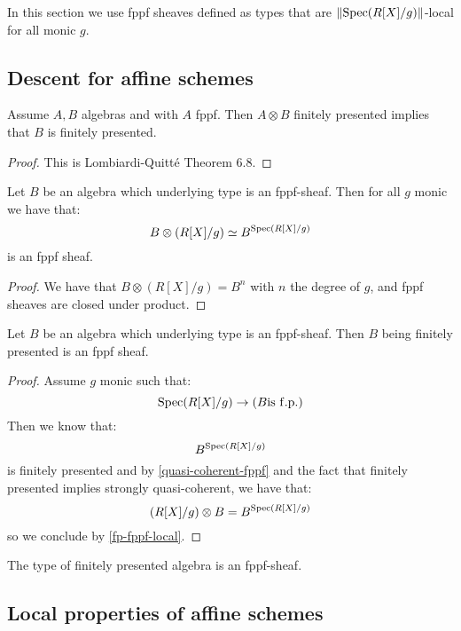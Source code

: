 In this section we use fppf sheaves defined as types that are $\lVert \operatorname{Spec}(R[X]/g) \rVert$-local for all monic $g$.

\subsection{Descent for affine schemes}

\begin{lemma}\label{fp-fppf-local}
Assume $A,B$ algebras and with $A$ fppf. Then $A\otimes B$ finitely presented implies that $B$ is finitely presented.
\end{lemma}

\begin{proof}
This is Lombiardi-Quitté Theorem 6.8.
\end{proof}

\begin{lemma}\label{quasi-coherent-fppf}
Let $B$ be an algebra which underlying type is an fppf-sheaf. Then for all $g$ monic we have that:
\[B\otimes (R[X]/g) \simeq B^{\operatorname{Spec}(R[X]/g)}\]
is an fppf sheaf.
\end{lemma}

\begin{proof}
We have that $B\otimes(R[X]/g) = B^n$ with $n$ the degree of $g$, and fppf sheaves are closed under product.
\end{proof}

\begin{lemma}
Let $B$ be an algebra which underlying type is an fppf-sheaf. Then $B$ being finitely presented is an fppf sheaf.
\end{lemma}

\begin{proof}
Assume $g$ monic such that:
\[\operatorname{Spec}(R[X]/g) \to (B \mathrm{is\ f.p.})\]
Then we know that:
\[B^{\operatorname{Spec}(R[X]/g)}\]
is finitely presented and by \cref{quasi-coherent-fppf} and the fact that finitely presented implies strongly quasi-coherent, we have that:
\[(R[X]/g)\otimes B = B^{\operatorname{Spec}(R[X]/g)}\]
so we conclude by \cref{fp-fppf-local}.
\end{proof}

\begin{corollary}
The type of finitely presented algebra is an fppf-sheaf.
\end{corollary}

\subsection{Local properties of affine schemes}

